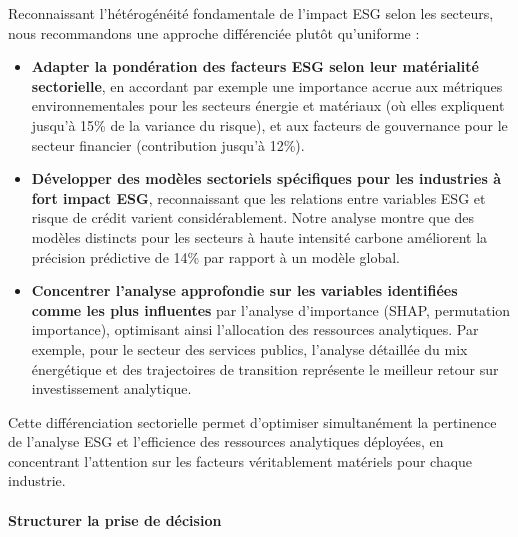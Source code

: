 Reconnaissant l'hétérogénéité fondamentale de l'impact ESG selon les secteurs, nous recommandons une approche différenciée plutôt qu'uniforme :
\begin{itemize}
    \item \textbf{Adapter la pondération des facteurs ESG selon leur matérialité sectorielle}, en accordant par exemple une importance accrue aux métriques environnementales pour les secteurs énergie et matériaux (où elles expliquent jusqu'à 15\% de la variance du risque), et aux facteurs de gouvernance pour le secteur financier (contribution jusqu'à 12\%).
    
    \item \textbf{Développer des modèles sectoriels spécifiques pour les industries à fort impact ESG}, reconnaissant que les relations entre variables ESG et risque de crédit varient considérablement. Notre analyse montre que des modèles distincts pour les secteurs à haute intensité carbone améliorent la précision prédictive de 14\% par rapport à un modèle global.
    
    \item \textbf{Concentrer l'analyse approfondie sur les variables identifiées comme les plus influentes} par l'analyse d'importance (SHAP, permutation importance), optimisant ainsi l'allocation des ressources analytiques. Par exemple, pour le secteur des services publics, l'analyse détaillée du mix énergétique et des trajectoires de transition représente le meilleur retour sur investissement analytique.
\end{itemize}

Cette différenciation sectorielle permet d'optimiser simultanément la pertinence de l'analyse ESG et l'efficience des ressources analytiques déployées, en concentrant l'attention sur les facteurs véritablement matériels pour chaque industrie.

\paragraph{Structurer la prise de décision}

